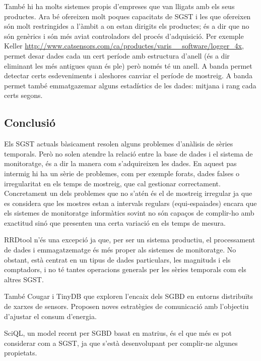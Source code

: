 \todo{} També hi ha molts sistemes propis d'empreses que van lligats
amb els seus productes. Ara bé ofereixen molt poques capacitats de
SGST i les que ofereixen són molt restringides a l'àmbit a on estan
dirigits els productes; és a dir que no són genèrics i són més aviat
controladors del procés d'adquisició. Per exemple Keller
\url{http://www.catsensors.com/ca/productes/varis__software/logger_4x}, permet desar dades cada un cert període amb estructura d'anell (és a dir eliminant les més antigues quan és ple) però només té un anell. A banda permet detectar certs esdeveniments i aleshores canviar el període de mostreig. A banda permet també emmatgazemar alguns estadístics de les dades: mitjana i rang cada certs segons.



\subsection{Conclusió}

Els SGST actuals bàsicament resolen alguns problemes d'anàlisis de sèries temporals.
Però no solen atendre la relació entre la base de dades i el sistema de monitoratge, és a dir la manera com s'adquireixen les dades. En aquest pas intermig hi ha un sèrie de problemes, com per exemple forats, dades falses o irregularitat en els temps de mostreig, que cal gestionar correctament. Concretament un dels problemes que no s'atén és el de mostreig irregular ja que es considera que les mostres estan a intervals regulars (equi-espaiades) encara que els sistemes de monitoratge informàtics sovint no són capaços de complir-ho amb exactitud sinó que presenten una certa variació en els temps de mesura. 

RRDtool n'és una excepció ja que, per ser un sistema productiu, el processament de dades i emmagatzematge és més proper als sistemes de monitoratge. No obstant, està centrat en un tipus de dades particulars, les magnituds i els comptadors, i no té tantes operacions generals per les sèries temporals com els altres SGST.

També Cougar i TinyDB que exploren l'encaix dels SGBD en entorns distribuïts de xarxes de sensors. Proposen noves estratègies de comunicació amb l'objectiu d'ajustar el consum d'energia. 


SciQL, un model recent per SGBD  basat en matrius, és el que més es pot considerar com a SGST, ja que s'està desenvolupant per complir-ne algunes propietats.












